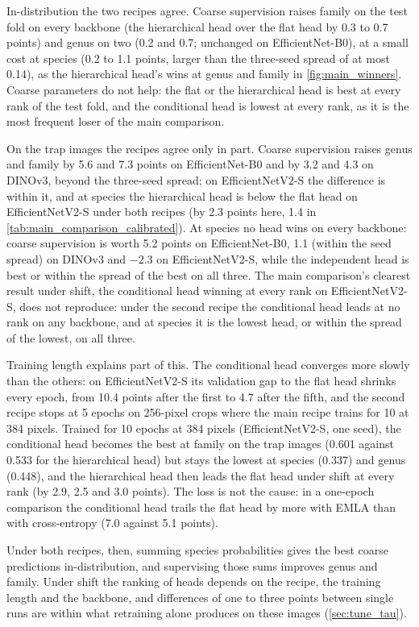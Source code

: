 In-distribution the two recipes agree.
Coarse supervision raises family on the test fold on every backbone (the hierarchical head over the flat head by 0.3 to 0.7 points) and genus on two (0.2 and 0.7; unchanged on EfficientNet-B0), at a small cost at species (0.2 to 1.1 points, larger than the three-seed spread of at most 0.14), as the hierarchical head's wins at genus and family in \cref{fig:main_winners}.
Coarse parameters do not help: the flat or the hierarchical head is best at every rank of the test fold, and the conditional head is lowest at every rank, as it is the most frequent loser of the main comparison.

On the trap images the recipes agree only in part.
Coarse supervision raises genus and family by 5.6 and 7.3 points on EfficientNet-B0 and by 3.2 and 4.3 on DINOv3, beyond the three-seed spread; on EfficientNetV2-S the difference is within it, and at species the hierarchical head is below the flat head on EfficientNetV2-S under both recipes (by 2.3 points here, 1.4 in \cref{tab:main_comparison_calibrated}).
At species no head wins on every backbone: coarse supervision is worth 5.2 points on EfficientNet-B0, 1.1 (within the seed spread) on DINOv3 and $-2.3$ on EfficientNetV2-S, while the independent head is best or within the spread of the best on all three.
The main comparison's clearest result under shift, the conditional head winning at every rank on EfficientNetV2-S, does not reproduce: under the second recipe the conditional head leads at no rank on any backbone, and at species it is the lowest head, or within the spread of the lowest, on all three.

Training length explains part of this.
The conditional head converges more slowly than the others: on EfficientNetV2-S its validation gap to the flat head shrinks every epoch, from 10.4 points after the first to 4.7 after the fifth, and the second recipe stops at 5 epochs on 256-pixel crops where the main recipe trains for 10 at 384 pixels.
Trained for 10 epochs at 384 pixels (EfficientNetV2-S, one seed), the conditional head becomes the best at family on the trap images (0.601 against 0.533 for the hierarchical head) but stays the lowest at species (0.337) and genus (0.448), and the hierarchical head then leads the flat head under shift at every rank (by 2.9, 2.5 and 3.0 points).
The loss is not the cause: in a one-epoch comparison the conditional head trails the flat head by more with EMLA than with cross-entropy (7.0 against 5.1 points).

Under both recipes, then, summing species probabilities gives the best coarse predictions in-distribution, and supervising those sums improves genus and family.
Under shift the ranking of heads depends on the recipe, the training length and the backbone, and differences of one to three points between single runs are within what retraining alone produces on these images (\cref{sec:tune_tau}).

